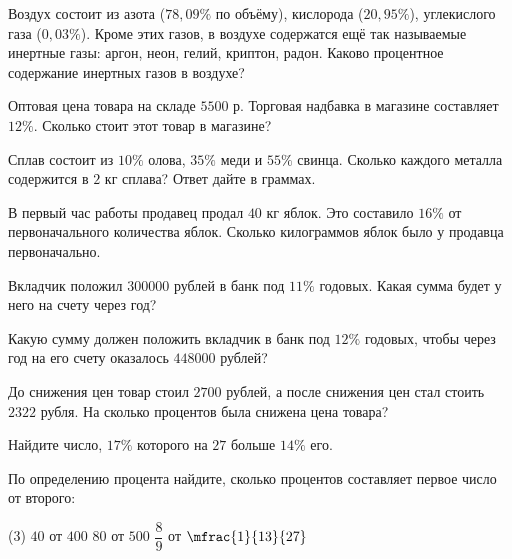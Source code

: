 \begin{class}[number=3]
	\begin{listofex}
		\item Воздух состоит из азота (\( 78,09\% \) по объёму), кислорода (\( 20,95\% \)), углекислого газа (\( 0,03\% \)). Кроме этих газов, в воздухе содержатся ещё так называемые инертные газы: аргон, неон, гелий, криптон, радон. Каково процентное содержание инертных газов в воздухе?
		\item Оптовая цена товара на складе \( 5500 \) р. Торговая надбавка в магазине составляет \( 12\% \). Сколько стоит этот товар в магазине?
		\item Сплав состоит из \( 10\% \) олова, \( 35\% \) меди и \( 55\% \) свинца. Сколько каждого металла содержится в \( 2 \) кг сплава? Ответ дайте в граммах.
		\item В первый час работы продавец продал \( 40 \) кг яблок. Это составило \( 16\% \) от первоначального количества яблок. Сколько килограммов яблок было у продавца первоначально.
		\item Вкладчик положил \( 300000 \) рублей в банк под \( 11\% \) годовых. Какая сумма будет у него на счету через год?
		\item Какую сумму должен положить вкладчик в банк под \( 12\% \) годовых, чтобы через год на его счету оказалось \( 448000 \) рублей?
		\item До снижения цен товар стоил \( 2700 \) рублей, а после снижения цен стал стоить \( 2322 \) рубля. На сколько процентов была снижена цена товара?
		\item Найдите число, \( 17\% \) которого на \( 27 \) больше \( 14\% \) его.
		\item По определению процента найдите, сколько процентов составляет первое число от второго:
		\begin{tasks}(3)
			\task \( 40 \) от \( 400 \)
			\task \( 80 \) от \( 500 \)
			\task \( \dfrac{8}{9} \) от \( \mfrac{1}{13}{27} \)
		\end{tasks}
	\end{listofex}
\end{class}
%
